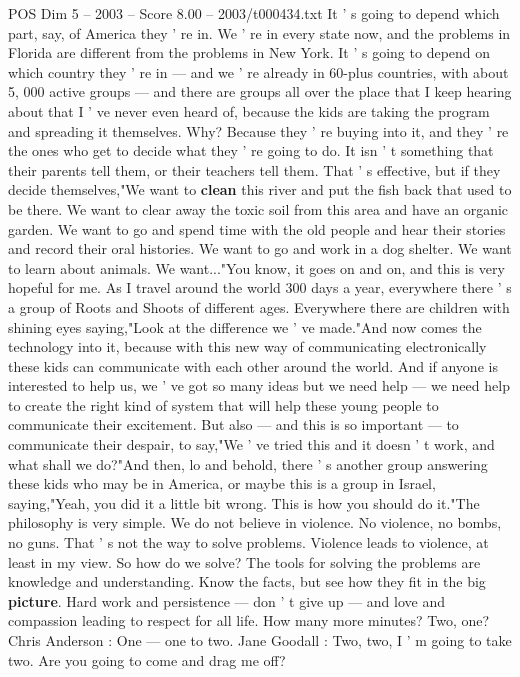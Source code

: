 \begin{textsample}{POS Dim 5 – 2003 – Score 8.00 – 2003/t000434.txt}
It ' s going to depend which part, say, of America they ' re in.
We ' re in every state now, and the problems in Florida are different from the problems in New York.
It ' s going to depend on which country they ' re in — and we ' re already in 60-plus countries, with about 5, 000 active groups — and there are groups all over the place that I keep hearing about that I ' ve never even heard of, because the kids are taking the program and spreading it themselves.
Why?
Because they ' re buying into it, and they ' re the ones who get to decide what they ' re going to do.
It isn ' t something that their parents tell them, or their teachers tell them.
That ' s effective, but if they decide themselves,"We want to \textbf{clean} this river and put the fish back that used to be there.
We want to clear away the toxic soil from this area and have an organic garden.
We want to go and spend time with the old people and hear their stories and record their oral histories.
We want to go and work in a dog shelter.
We want to learn about animals.
We want..."You know, it goes on and on, and this is very hopeful for me.
As I travel around the world 300 days a year, everywhere there ' s a group of Roots and Shoots of different ages.
Everywhere there are children with shining eyes saying,"Look at the difference we ' ve made."And now comes the technology into it, because with this new way of communicating electronically these kids can communicate with each other around the world.
And if anyone is interested to help us, we ' ve got so many ideas but we need help — we need help to create the right kind of system that will help these young people to communicate their excitement.
But also — and this is so important — to communicate their despair, to say,"We ' ve tried this and it doesn ' t work, and what shall we do?"And then, lo and behold, there ' s another group answering these kids who may be in America, or maybe this is a group in Israel, saying,"Yeah, you did it a little bit wrong.
This is how you should do it."The philosophy is very simple.
We do not believe in violence.
No violence, no bombs, no guns.
That ' s not the way to solve problems.
Violence leads to violence, at least in my view.
So how do we solve?
The tools for solving the problems are knowledge and understanding.
Know the facts, but see how they fit in the big \textbf{picture}.
Hard work and persistence — don ' t give up — and love and compassion leading to respect for all life.
How many more minutes?
Two, one?
Chris Anderson : One — one to two.
Jane Goodall : Two, two, I ' m going to take two.
Are you going to come and drag me off?

\end{textsample}
